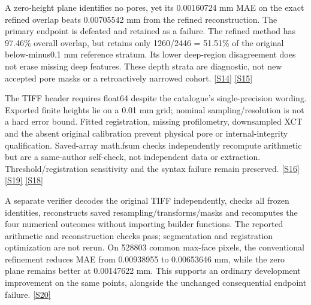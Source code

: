 \documentclass[11pt,letterpaper]{article}
\begin{document}
A zero-height plane identifies no pores, yet its 0.00160724 mm MAE on the exact refined overlap beats 0.00705542 mm from the refined reconstruction. The primary endpoint is defeated and retained as a failure. The refined method has 97.46\% overall overlap, but retains only 1260/2446 = 51.51\% of the original below-minus0.1 mm reference stratum. Its lower deep-region disagreement does not erase missing deep features. These depth strata are diagnostic, not new accepted pore masks or a retroactively narrowed cohort. \href{https://github.com/MontrealAI/AGI-Alpha-Invention-Flywheel-Lab/blob/2b7a58e6e6593ae48da6f7f33865db94868c957f/research/nasa008/development/PLANE_COMPARATOR.json}{[S14]} \href{https://github.com/MontrealAI/AGI-Alpha-Invention-Flywheel-Lab/blob/2b7a58e6e6593ae48da6f7f33865db94868c957f/research/nasa008/development/STRATIFIED_COVERAGE.json}{[S15]}\par
The TIFF header requires float64 despite the catalogue's single-precision wording. Exported finite heights lie on a 0.01 mm grid; nominal sampling/resolution is not a hard error bound. Fitted registration, missing profilometry, downsampled XCT and the absent original calibration prevent physical pore or internal-integrity qualification. Saved-array math.fsum checks independently recompute arithmetic but are a same-author self-check, not independent data or extraction. Threshold/registration sensitivity and the syntax failure remain preserved. \href{https://github.com/MontrealAI/AGI-Alpha-Invention-Flywheel-Lab/blob/2b7a58e6e6593ae48da6f7f33865db94868c957f/research/nasa008/development/ARRAY_CHECK.json}{[S16]} \href{https://github.com/MontrealAI/AGI-Alpha-Invention-Flywheel-Lab/blob/2b7a58e6e6593ae48da6f7f33865db94868c957f/research/nasa008/development/CHRONOLOGY.json}{[S19]} \href{https://github.com/MontrealAI/AGI-Alpha-Invention-Flywheel-Lab/blob/2b7a58e6e6593ae48da6f7f33865db94868c957f/research/nasa008/development/RESOURCE_LEDGER.json}{[S18]}\par
A separate verifier decodes the original TIFF independently, checks all frozen identities, reconstructs saved resampling/transforms/masks and recomputes the four numerical outcomes without importing builder functions. The reported arithmetic and reconstruction checks pass; segmentation and registration optimization are not rerun. On 528803 common max-face pixels, the conventional refinement reduces MAE from 0.00938955 to 0.00653646 mm, while the zero plane remains better at 0.00147622 mm. This supports an ordinary development improvement on the same points, alongside the unchanged consequential endpoint failure. \href{https://github.com/MontrealAI/AGI-Alpha-Invention-Flywheel-Lab/blob/2b7a58e6e6593ae48da6f7f33865db94868c957f/evidence/overnight-008/verifier-recovery-later/nasa-review-r2-bound/artifacts/REPORT.json}{[S20]}\par
\end{document}
